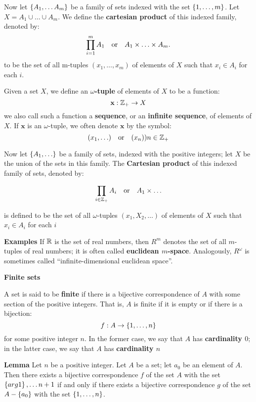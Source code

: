 Now let $ \left\lbrace A_1, \ldots A_m \right\rbrace $ be a family of sets indexed with the set $ \left\lbrace 1, \ldots, m \right\rbrace $. Let $ X = A_1 \cup \ldots \cup A_m $. We define the \textbf{cartesian product} of this indexed family, denoted by:
\[ \prod_{i=1}^{m} A_1 \quad \textrm{or} \quad A_1 \times \ldots \times A_m.  \]
to be the set of all m-tuples $(x_1, \ldots, x_m) $ of elements of $X$ such that $ x_i \in A_i $ for each $i$.

\begin{define}
	Given a set $X$, we define an\textbf{ $ \omega$-tuple} of elements of $X$ to be a function:
	\[ \textbf{x}: \mathbb{Z}_+ \rightarrow X \]
	we also call such a function a \textbf{sequence}, or an \textbf{infinite sequence}, of elements of $X$. If $\textbf{x}$ is an $\omega$-tuple, we often denote $\textbf{x} $ by the symbol:
	\[ (x_1, \ldots) \quad \textrm{or} \quad (x_n)){n\in \mathbb{Z}_+} \]
\end{define}	
Now let $ \left\lbrace A_1, \ldots \right\rbrace $ be a family of sets, indexed with the positive integers; let $X$ be the union of the sets in this family. The \textbf{Cartesian product} of this indexed family of sets, denoted by:

 \[ \prod_{i \in \mathbb{Z}_+} A_i \quad \textrm{or} \quad A_1 \times \ldots \] 
 
 is defined to be the set of all $ \omega $-tuples $ (x_1,X_2, \ldots)  $ of elements of $X$ such that $ x_i \in A_i $ for each $i$

\textbf{Examples}
If $ \mathbb{R} $ is the set of real numbers, then $ R^m $ denotes the set of all $ m $-tuples of real numbers; it is often called \textbf{euclidean $ m $-space}. Analogously, $ R^\omega $ is sometimes called ``infinite-dimensional euclidean space''.

\textbf{\LARGE Finite sets}

\begin{define}
	A set is said to be \textbf{finite} if there is a bijective correspondence of $A$ with some section of the positive integers. That is, $A$ is finite if it is empty or if there is a bijection:
	\[ f : A \rightarrow \left\lbrace 1,\ldots,n \right\rbrace \]
	for some positive integer $n$. In the former case, we say that $A$ has \textbf{cardinality $0$}; in the latter case, we say that $A$ has \textbf{cardinality $n$}
\end{define}

\textbf{Lemma} Let $n$ be a positive integer. Let $A$ be a set; let $a_0$ be an element of $A$. Then there exists a bijective correspondence $f$ of the set $A$ with the set $\left\lbrace arg1 \right\rbrace, \ldots n+1$ if and only if there exists a bijective correspondence $g$ of the set $ A - \left\lbrace a_0 \right\rbrace$ with the set $ \left\lbrace 1, \ldots, n \right\rbrace $.

